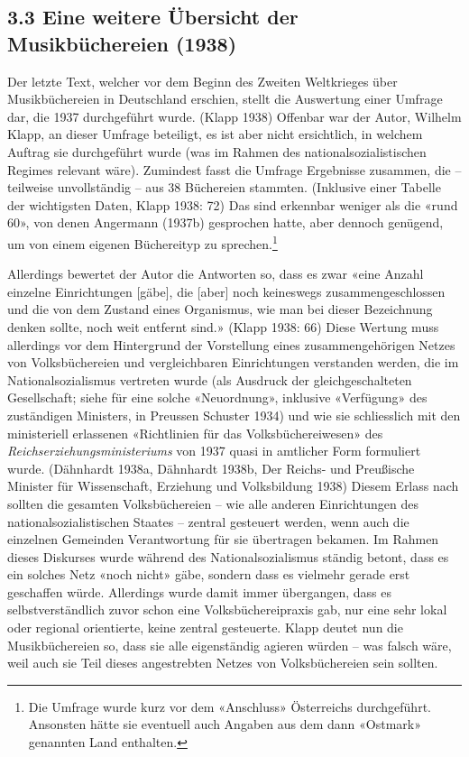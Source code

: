 \documentclass[a4paper,
fontsize=11pt,
oneside,
numbers=noperiodatend,
parskip=half-,
bibliography=totoc,
final
]{scrartcl}
\begin{document}
\hypertarget{eine-weitere-uxfcbersicht-der-musikbuxfcchereien-1938}{%
\subsection{3.3 Eine weitere Übersicht der Musikbüchereien
(1938)}\label{eine-weitere-uxfcbersicht-der-musikbuxfcchereien-1938}}

Der letzte Text, welcher vor dem Beginn des Zweiten Weltkrieges über
Musikbüchereien in Deutschland erschien, stellt die Auswertung einer
Umfrage dar, die 1937 durchgeführt wurde. (Klapp 1938) Offenbar war der
Autor, Wilhelm Klapp, an dieser Umfrage beteiligt, es ist aber nicht
ersichtlich, in welchem Auftrag sie durchgeführt wurde (was im Rahmen
des nationalsozialistischen Regimes relevant wäre). Zumindest fasst die
Umfrage Ergebnisse zusammen, die -- teilweise unvollständig -- aus 38
Büchereien stammten. (Inklusive einer Tabelle der wichtigsten Daten,
Klapp 1938: 72) Das sind erkennbar weniger als die «rund 60», von denen
Angermann (1937b) gesprochen hatte, aber dennoch genügend, um von einem
eigenen Büchereityp zu sprechen.\footnote{Die Umfrage wurde kurz vor dem
  «Anschluss» Österreichs durchgeführt. Ansonsten hätte sie eventuell
  auch Angaben aus dem dann «Ostmark» genannten Land enthalten.}

Allerdings bewertet der Autor die Antworten so, dass es zwar «eine
Anzahl einzelne Einrichtungen {[}gäbe{]}, die {[}aber{]} noch keineswegs
zusammengeschlossen und die von dem Zustand eines Organismus, wie man
bei dieser Bezeichnung denken sollte, noch weit entfernt sind.» (Klapp
1938: 66) Diese Wertung muss allerdings vor dem Hintergrund der
Vorstellung eines zusammengehörigen Netzes von Volksbüchereien und
vergleichbaren Einrichtungen verstanden werden, die im
Nationalsozialismus vertreten wurde (als Ausdruck der gleichgeschalteten
Gesellschaft; siehe für eine solche «Neuordnung», inklusive «Verfügung»
des zuständigen Ministers, in Preussen Schuster 1934) und wie sie
schliesslich mit den ministeriell erlassenen «Richtlinien für das
Volksbüchereiwesen» des \emph{Reichserziehungsministeriums} von 1937
quasi in amtlicher Form formuliert wurde. (Dähnhardt 1938a, Dähnhardt
1938b, Der Reichs- und Preußische Minister für Wissenschaft, Erziehung
und Volksbildung 1938) Diesem Erlass nach sollten die gesamten
Volksbüchereien -- wie alle anderen Einrichtungen des
nationalsozialistischen Staates -- zentral gesteuert werden, wenn auch
die einzelnen Gemeinden Verantwortung für sie übertragen bekamen. Im
Rahmen dieses Diskurses wurde während des Nationalsozialismus ständig
betont, dass es ein solches Netz «noch nicht» gäbe, sondern dass es
vielmehr gerade erst geschaffen würde. Allerdings wurde damit immer
übergangen, dass es selbstverständlich zuvor schon eine
Volksbüchereipraxis gab, nur eine sehr lokal oder regional orientierte,
keine zentral gesteuerte. Klapp deutet nun die Musikbüchereien so, dass
sie alle eigenständig agieren würden -- was falsch wäre, weil auch sie
Teil dieses angestrebten Netzes von Volksbüchereien sein sollten.
\end{document}
